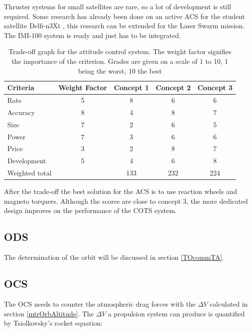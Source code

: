 Thruster systems for small satellites are rare, so a lot of development is still required. Some research has already been done on an active \ac{ACS} for the student satellite Delfi-n3Xt \cite{delfispace}, this research can be extended for the Laser Swarm mission. The IMI-100 system is ready and just has to be integrated. 

\begin{table} [h]
\centering
\begin{tabular}{p{3cm} | c | c c c}
\textbf{Criteria} & \textbf{Weight Factor} & \textbf{Concept 1} & \textbf{Concept 2} & \textbf{Concept 3} \\ \hline \hline
Rate 	    & 5 & 8 & 6 & 6 \\
Accuracy    & 8 & 4 & 8 & 7 \\
Size        & 7 & 2 & 6 & 5 \\
Power       & 7 & 3 & 6 & 6 \\
Price       & 3 & 2 & 8 & 7 \\
Development & 5 & 4 & 6 & 8 \\ \hline
Weighted total    &    & 133 & 232 & 224
\end{tabular} 
\caption[Tradeoff attitude control]{Trade-off graph for the attitude control system. The weight factor signifies the importance of the criterion. Grades are given on a scale of 1 to 10, 1 being the worst, 10 the best}
\label{tab:acstradeoff}
\end{table}

After the trade-off the best solution for the \ac{ACS} is to use reaction wheels and magneto torquers. Although the scores are close to concept 3, the more dedicated design improves on the performance of the \ac{COTS} system.

\subsection{\acl{ODS}}
\label{ss:ods}
The determination of the orbit will be discussed in section \ref{TOcommTA}.

\subsection{\acl{OCS}}
\label{ss:ocs}

The \ac{OCS} needs to counter the atmospheric drag forces with the $\Delta V$ calculated in section \ref{mtrOrbAltitude}. The $\Delta V$ a propulsion system can produce is quantified by Tsiolkovsky's rocket equation:

